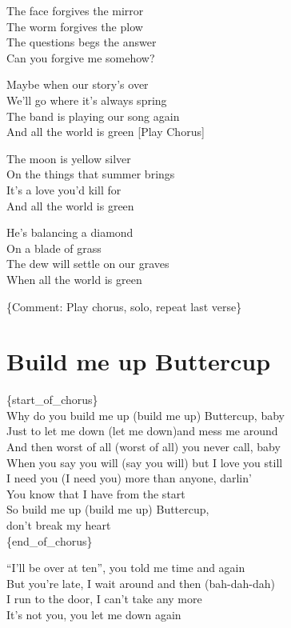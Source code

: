 \documentclass[
  letterpaper,
  DIV=11,
  numbers=noendperiod]{scrreprt}
\begin{document}
The face forgives the mirror\\
The worm forgives the plow\\
The questions begs the answer\\
Can you forgive me somehow?

Maybe when our story's over\\
We'll go where it's always spring\\
The band is playing our song again\\
And all the world is green {[}Play Chorus{]}

The moon is yellow silver\\
On the things that summer brings\\
It's a love you'd kill for\\
And all the world is green

He's balancing a diamond\\
On a blade of grass\\
The dew will settle on our graves\\
When all the world is green

\{Comment: Play chorus, solo, repeat last verse\}

\hypertarget{build-me-up-buttercup}{%
\chapter{Build me up Buttercup}\label{build-me-up-buttercup}}

\{start\_of\_chorus\}\\
Why do you build me up (build me up) Buttercup, baby\\
Just to let me down (let me down)and mess me around\\
And then worst of all (worst of all) you never call, baby\\
When you say you will (say you will) but I love you still\\
I need you (I need you) more than anyone, darlin'\\
You know that I have from the start\\
So build me up (build me up) Buttercup,\\
don't break my heart\\
\{end\_of\_chorus\}

``I'll be over at ten'', you told me time and again\\
But you're late, I wait around and then (bah-dah-dah)\\
I run to the door, I can't take any more\\
It's not you, you let me down again
\end{document}
